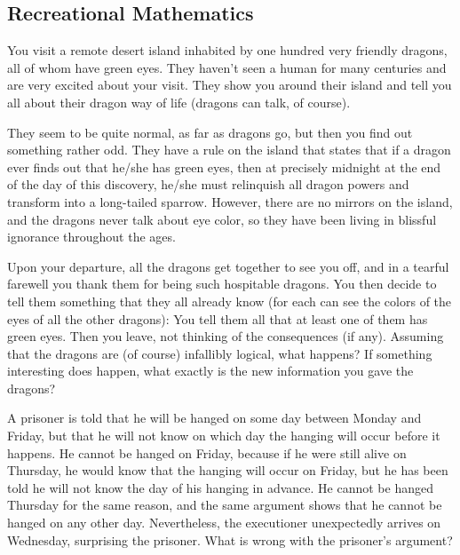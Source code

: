 \documentclass[12pt]{article}
\begin{document}
    \subsection{Recreational Mathematics}

    \begin{exercise}
        You visit a remote desert island inhabited by one hundred very friendly dragons, all of whom have green eyes. They haven't seen a human for many centuries and are very excited about your visit. They show you around their island and tell you all about their dragon way of life (dragons can talk, of course).
    
        They seem to be quite normal, as far as dragons go, but then you find out something rather odd. They have a rule on the island that states that if a dragon ever finds out that he/she has green eyes, then at precisely midnight at the end of the day of this discovery, he/she must relinquish all dragon powers and transform into a long-tailed sparrow. However, there are no mirrors on the island, and the dragons never talk about eye color, so they have been living in blissful ignorance throughout the ages.

        Upon your departure, all the dragons get together to see you off, and in a tearful farewell you thank them for being such hospitable dragons. You then decide to tell them something that they all already know (for each can see the colors of the eyes of all the other dragons): You tell them all that at least one of them has green eyes. Then you leave, not thinking of the consequences (if any). Assuming that the dragons are (of course) infallibly logical, what happens? If something interesting does happen, what exactly is the new information you gave the dragons?
    \end{exercise}
    
    \begin{exercise}
        A prisoner is told that he will be hanged on some day between Monday and Friday, but that he will not know on which day the hanging will occur before it happens. He cannot be hanged on Friday, because if he were still alive on Thursday, he would know that the hanging will occur on Friday, but he has been told he will not know the day of his hanging in advance. He cannot be hanged Thursday for the same reason, and the same argument shows that he cannot be hanged on any other day. Nevertheless, the executioner unexpectedly arrives on Wednesday, surprising the prisoner. What is wrong with the prisoner's argument?
    \end{exercise}
\end{document}
